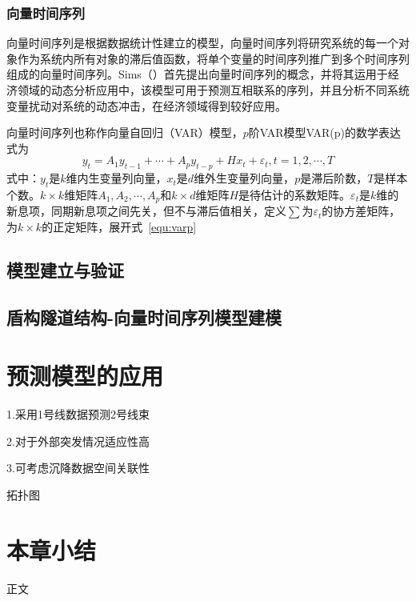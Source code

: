 \subsubsection{向量时间序列}

向量时间序列是根据数据统计性建立的模型，向量时间序列将研究系统的每一个对象作为系统内所有对象的滞后值函数，将单个变量的时间序列推广到多个时间序列组成的向量时间序列。Sims（\citeyear{sims1980macroeconomics}）首先提出向量时间序列的概念，并将其运用于经济领域的动态分析应用中，该模型可用于预测互相联系的序列，并且分析不同系统变量扰动对系统的动态冲击，在经济领域得到较好应用。

向量时间序列也称作向量自回归（VAR）模型，$p$阶VAR模型VAR(p)的数学表达式为
\begin{equation}
	\label{equ:varp}
	{{y}_{t}}={{A}_{1}}{{y}_{t-1}}+\cdots +{{A}_{p}}{{y}_{t-p}}+H{{x}_{t}}+{{\varepsilon }_{t}},t=1,2,\cdots ,T
\end{equation}
式中：$y_t$是$k$维内生变量列向量，$x_t$是$d$维外生变量列向量，$p$是滞后阶数，$T$是样本个数。$k\times k$维矩阵$A_1,A_2,\cdots ,A_p$和$k\times d$维矩阵$H$是待估计的系数矩阵。${\varepsilon }_{t}$是$k$维的新息项，同期新息项之间先关，但不与滞后值相关，定义$\sum$为${\varepsilon }_{t}$的协方差矩阵，为$k\times k$的正定矩阵，展开式~\ref{equ:varp}~


\subsection{模型建立与验证}

\subsection{盾构隧道结构-向量时间序列模型建模}




\section{预测模型的应用}

1.采用1号线数据预测2号线束

2.对于外部突发情况适应性高

3.可考虑沉降数据空间关联性

拓扑图

\section{本章小结}

正文